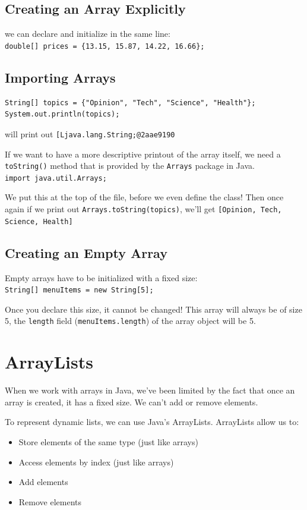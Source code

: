 \documentclass[a4paper, 12pt]{article}
\begin{document}
\subsection{Creating an Array Explicitly}
we can declare and initialize in the same line:\\
\verb|double[] prices = {13.15, 15.87, 14.22, 16.66};|

\subsection{Importing Arrays}
\begin{verbatim}
String[] topics = {"Opinion", "Tech", "Science", "Health"};
System.out.println(topics);
\end{verbatim}
will print out \verb|[Ljava.lang.String;@2aae9190|

If we want to have a more descriptive printout of the array itself, we need a \verb|toString()| method that is provided by the \verb|Arrays| package in Java.\\
\verb|import java.util.Arrays;|

We put this at the top of the file, before we even define the class! Then once again if we print out \verb|Arrays.toString(topics)|, we'll get \verb|[Opinion, Tech, Science, Health]|

\subsection{Creating an Empty Array}
Empty arrays have to be initialized with a fixed size:\\
\verb|String[] menuItems = new String[5];|

Once you declare this size, it cannot be changed! This array will always be of size 5, the \verb|length| field (\verb|menuItems.length|) of the array object will be 5.


\section{ArrayLists}
When we work with arrays in Java, we've been limited by the fact that once an array is created, it has a fixed size. We can't add or remove elements.

To represent dynamic lists, we can use Java's ArrayLists. ArrayLists allow us to:
\begin{itemize}
\item Store elements of the same type (just like arrays)

\item Access elements by index (just like arrays)

\item Add elements

\item Remove elements

\end{itemize}
\end{document}
